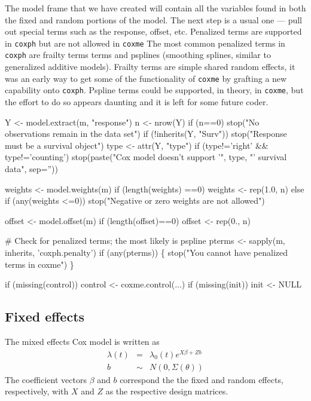 \documentclass{article}
\begin{document}
The model frame that we have created will contain all the variables found
in both the fixed and random portions of the model.
The next step is a usual one --- pull out special terms such as the response,
offset, etc.
Penalized terms are supported in {\tt{}coxph} but are not allowed in {\tt{}coxme}
The most common penalized terms in {\tt{}coxph} are frailty terms
terms and psplines
(smoothing splines, similar to generalized additive models).
Frailty terms are simple shared random effects, 
it was an early way to get some of
the functionality of {\tt{}coxme} by grafting a new capability onto {\tt{}coxph}.
Pspline terms could be supported, in theory, in {\tt{}coxme}, but the
effort to do so appears daunting and it is left for some future coder.

\nwenddocs{}\plusendmoddef
    Y <- model.extract(m, "response")
    n <- nrow(Y)
    if (n==0) stop("No observations remain in the data set")
    if (!inherits(Y, "Surv")) stop("Response must be a survival object")
    type <- attr(Y, "type")
    if (type!='right' && type!='counting')
        stop(paste("Cox model doesn't support '", type,
                          "' survival data", sep=''))

    weights <- model.weights(m)
    if (length(weights) ==0) weights <- rep(1.0, n)
    else if (any(weights <=0))
        stop("Negative or zero weights are not allowed")

    offset <- model.offset(m)
    if (length(offset)==0) offset <- rep(0., n)

    # Check for penalized terms; the most likely is pspline
    pterms <- sapply(m, inherits, 'coxph.penalty')
    if (any(pterms)) \{
        stop("You cannot have penalized terms in coxme")
        \}

    if (missing(control)) control <- coxme.control(...)
    if (missing(init)) init <- NULL
\nwendcode{}\nwdocspar
%
%
\subsection{Fixed effects}
The mixed effects Cox model is written as
\begin{eqnarray*}
  \lambda(t) &=& \lambda_0(t) e^{X \beta + Z b}\\
  b &\sim& N(0, \Sigma(\theta))
\end{eqnarray*}
The coefficient vectors $\beta$ and $b$ correspond the the
fixed and random effects, respectively,
with $X$ and $Z$ as the respective design matrices.
\end{document}
